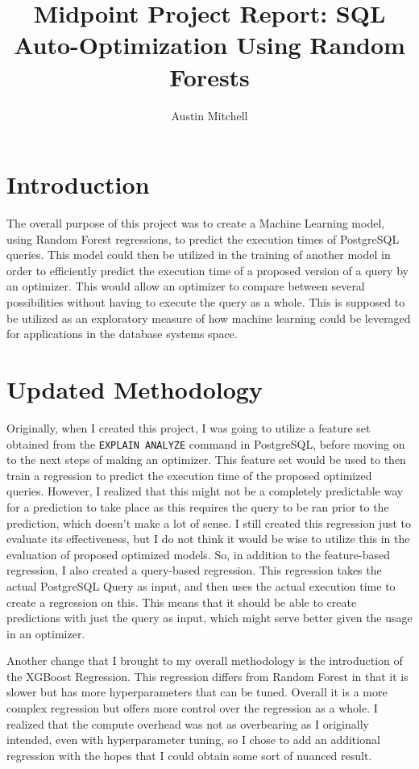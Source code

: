 \documentclass[sigconf]{acmart}
\title{Midpoint Project Report: SQL Auto-Optimization Using Random Forests}
\author{Austin Mitchell}
\affiliation{%
  \institution{Georgia Institute of Technology}
  \city{Atlanta, GA}
  \country{United States}
}
\begin{document}
\maketitle

\section{Introduction}
The overall purpose of this project was to create a Machine Learning model, using Random Forest regressions, to predict the execution times of PostgreSQL
queries. This model could then be utilized in the training of another model in order to efficiently predict the execution time of a proposed version of a query
by an optimizer. This would allow an optimizer to compare between several possibilities without having to execute the query as a whole. This is supposed to be
utilized as an exploratory measure of how machine learning could be leveraged for applications in the database systems space.

\section{Updated Methodology}
Originally, when I created this project, I was going to utilize a feature set obtained from the \texttt{EXPLAIN ANALYZE} command in PostgreSQL, 
before moving on to the next steps of making an optimizer. This feature set would be used to then train a regression to predict the execution time 
of the proposed optimized queries. However, I realized that this might not be a completely predictable way for a prediction to take place as this requires
the query to be ran prior to the prediction, which doesn't make a lot of sense. I still created this regression just to evaluate its effectiveness, but I do
not think it would be wise to utilize this in the evaluation of proposed optimized models. So, in addition to the feature-based regression, I also created
a query-based regression. This regression takes the actual PostgreSQL Query as input, and then uses the actual execution time to create a regression on this.
This means that it should be able to create predictions with just the query as input, which might serve better given the usage in an optimizer.

Another change that I brought to my overall methodology is the introduction of the XGBoost Regression. This regression differs from Random Forest in that
it is slower but has more hyperparameters that can be tuned. Overall it is a more complex regression but offers more control over the regression as a whole.
I realized that the compute overhead was not as overbearing as I originally intended, even with hyperparameter tuning, so I chose to add an additional regression with
the hopes that I could obtain some sort of nuanced result.
\end{document}
